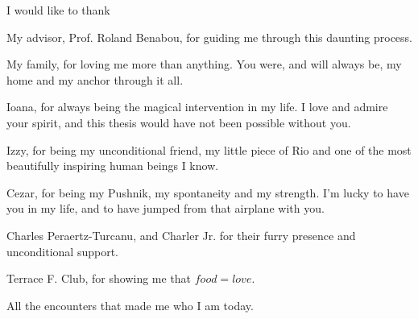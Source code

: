 I would like to thank 

My advisor, Prof. Roland Benabou, for guiding me through this daunting process. \par

My family, for loving me more than anything. You were, and will always be, my home and my anchor through it all. \par

Ioana, for always being the magical intervention in my life. I love and admire your spirit, and this thesis would have not been possible without you. \par

Izzy, for being my unconditional friend, my little piece of Rio and one of the most beautifully inspiring human beings I know. 

Cezar, for being my Pushnik, my spontaneity and my strength. I'm lucky to have you in my life, and to have jumped from that airplane with you. \par

Charles Peraertz-Turcanu, and Charler Jr. for their furry presence and unconditional support. \par

Terrace F. Club, for showing me that $food = love$.\par

All the encounters that made me who I am today.

